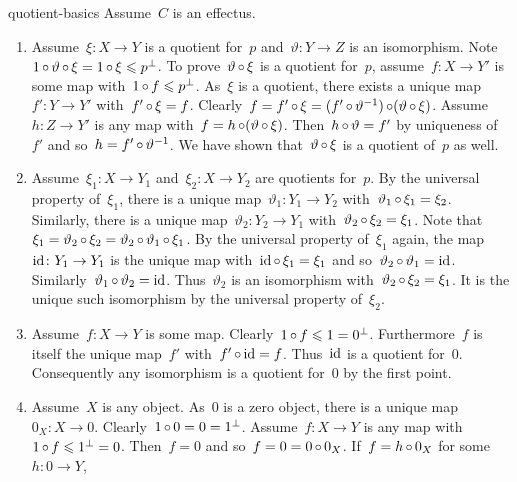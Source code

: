 \begin{solution}{quotient-basics}%
Assume~$C$ is an effectus.
\begin{enumerate}
\item
Assume~$\xi \colon X \to Y$ is a quotient for~$p$
    and~$\vartheta \colon Y \to Z$ is an isomorphism.
Note~$1 \mathop{\circ} \vartheta \mathop{\circ} \xi = 1 \mathop{\circ} \xi \leqslant p^\perp$.
To prove~$\vartheta \mathop{\circ} \xi$ is a quotient for~$p$,
    assume~$f\colon X \to Y'$ is some map
        with~$1 \mathop{\circ} f \leqslant p^\perp$.
    As~$\xi$ is a quotient, there exists a unique map~$f'\colon Y \to Y'$
        with~$f' \mathop{\circ} \xi = f$.
        Clearly~$f = f' \mathop{\circ} \xi =
            (f' \mathop{\circ} \vartheta^{-1}) \mathop{\circ} (\vartheta \mathop{\circ} \xi)$.
Assume~$h\colon Z \to Y'$ is any map with~$f = h\mathop{\circ} (\vartheta \mathop{\circ} \xi)$.
Then~$h \mathop{\circ} \vartheta = f'$ by uniqueness of~$f'$
        and so~$h = f' \mathop{\circ} \vartheta^{-1}$.
    We have shown that~$\vartheta \mathop{\circ} \xi$ is a quotient of~$p$ as well.
\item
    Assume~$\xi_1 \colon X \to Y_1$
            and~$\xi_2 \colon X \to Y_2$
        are quotients for~$p$.
    By the universal property of~$\xi_1$,
            there is a unique map~$\vartheta_1 \colon Y_1 \to Y_2$
            with~$\vartheta_1 \mathop{\circ} \xi_1 = \xi_2$.
    Similarly, there is a unique map~$\vartheta_2 \colon Y_2 \to Y_1$
            with~$\vartheta_2 \mathop{\circ} \xi_2 = \xi_1$.
Note that~$\xi_1 = \vartheta_2 \mathop{\circ} \xi_2 = \vartheta_2 \mathop{\circ} \vartheta_1 \mathop{\circ} \xi_1$.
By the universal property of~$\xi_1$ again,
        the map~$\mathrm{id}\colon Y_1 \to Y_1$
            is the unique map with~$\mathrm{id} \mathop{\circ} \xi_1 = \xi_1$
                and so~$\vartheta_2 \mathop{\circ} \vartheta_1 = \mathrm{id}$.
                Similarly~$\vartheta_1 \mathop{\circ} \vartheta_2 = \mathrm{id}$.
        Thus~$\vartheta_2$ is an isomorphism
            with~$\vartheta_2 \mathop{\circ} \xi_2 = \xi_1$.
            It is the unique such isomorphism by the universal property of~$\xi_2$.
\item
Assume~$f\colon X \to Y$ is some map.
        Clearly~$1 \mathop{\circ} f \leqslant 1 = 0^\perp$.
Furthermore~$f$ is itself the unique map~$f'$ with~$f' \mathop{\circ} \mathrm{id} = f$.
Thus~$\mathrm{id}$ is a quotient for~$0$.
        Consequently any isomorphism is a quotient for~$0$ by the first point.
\item
Assume~$X$ is any object.
As~$0$ is a zero object,
    there is a unique map~$0_X \colon X \to 0$.
Clearly~$1 \mathop{\circ} 0 = 0 = 1^\perp$.
Assume~$f\colon X \to Y$ is any map with~$1 \mathop{\circ} f \leqslant 1^\perp= 0$.
Then~$f = 0$ and so~$f = 0 = 0 \mathop{\circ} 0_X$.
If~$f = h \mathop{\circ} 0_X$ for some~$h\colon 0 \to Y$,

\end{enumerate}
\end{solution}
